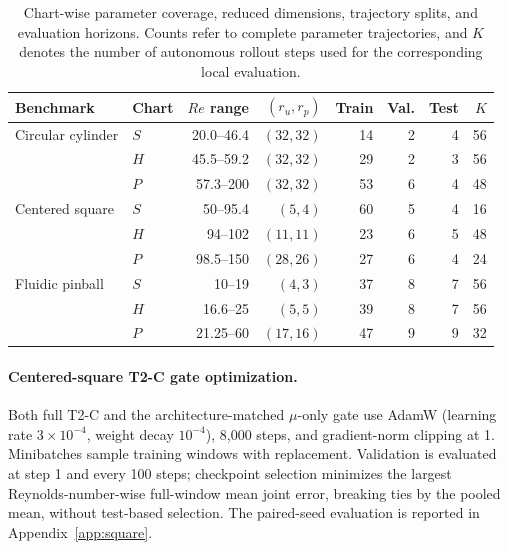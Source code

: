\par
\begin{table}[H]
\centering
\caption{
Chart-wise parameter coverage, reduced dimensions, trajectory splits, and evaluation horizons. Counts refer to complete parameter trajectories, and $K$ denotes the number of autonomous rollout steps used for the corresponding local evaluation.
}
\label{tab:chart_splits}
\small
\setlength{\tabcolsep}{3.5pt}
\begin{tabular}{@{}llrrrrrr@{}}
\toprule
Benchmark & Chart & $Re$ range & $(r_u,r_p)$ & Train & Val. & Test & $K$ \\
\midrule
Circular cylinder
& $S$ & 20.0--46.4 & $(32,32)$ & 14 & 2 & 4 & 56 \\
& $H$ & 45.5--59.2 & $(32,32)$ & 29 & 2 & 3 & 56 \\
& $P$ & 57.3--200 & $(32,32)$ & 53 & 6 & 4 & 48 \\
\addlinespace
Centered square
& $S$ & 50--95.4 & $(5,4)$ & 60 & 5 & 4 & 16 \\
& $H$ & 94--102 & $(11,11)$ & 23 & 6 & 5 & 48 \\
& $P$ & 98.5--150 & $(28,26)$ & 27 & 6 & 4 & 24 \\
\addlinespace
Fluidic pinball
& $S$ & 10--19 & $(4,3)$ & 37 & 8 & 7 & 56 \\
& $H$ & 16.6--25 & $(5,5)$ & 39 & 8 & 7 & 56 \\
& $P$ & 21.25--60 & $(17,16)$ & 47 & 9 & 9 & 32 \\
\bottomrule
\end{tabular}
\end{table}
\par


\paragraph{Centered-square T2-C gate optimization.}
Both full T2-C and the architecture-matched $\mu$-only gate use AdamW
(learning rate $3\times10^{-4}$, weight decay $10^{-4}$), 8,000 steps,
and gradient-norm clipping at 1. Minibatches sample training windows with
replacement. Validation is evaluated at step 1 and every 100 steps;
checkpoint selection minimizes the largest Reynolds-number-wise full-window mean joint
error, breaking ties by the pooled mean, without test-based selection.
The paired-seed evaluation is reported in Appendix~\ref{app:square}.



